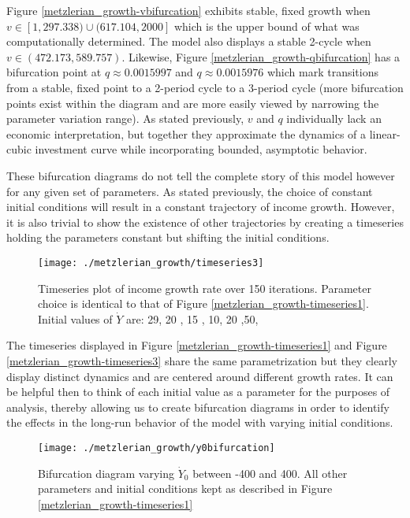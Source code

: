 Figure \ref{metzlerian_growth-vbifurcation} exhibits stable, fixed growth when $v\in[1,297.338)\cup(617.104, 2000]$ which is the upper bound of what was computationally determined. The model also displays a stable 2-cycle when $v\in(472.173, 589.757)$. Likewise, Figure \ref{metzlerian_growth-qbifurcation} has a bifurcation point at $q\approx0.0015997$ and $q\approx0.0015976$ which mark transitions from a stable, fixed point to a 2-period cycle to a 3-period cycle (more bifurcation points exist within the diagram and are more easily viewed by narrowing the parameter variation range). As stated previously, $v$ and $q$ individually lack an economic interpretation, but together they approximate the dynamics of a linear-cubic investment curve while incorporating bounded, asymptotic behavior. 

These bifurcation diagrams do not tell the complete story of this model however for any given set of parameters. As stated previously, the choice of constant initial conditions will result in a constant trajectory of income growth. However, it is also trivial to show the existence of other trajectories by creating a timeseries holding the parameters constant but shifting the initial conditions.
\begin{figure}
    \centering
    \texttt{[image: ./metzlerian\_growth/timeseries3]}
    \caption{Timeseries plot of income growth rate over 150 iterations. Parameter choice is identical to that of Figure \ref{metzlerian_growth-timeseries1}. Initial values of $\dot Y$ are: 29, 20 , 15 , 10, 20 ,50,}
    \label{metzlerian_growth_timeseries3}
\end{figure}

The timeseries displayed in Figure \ref{metzlerian_growth-timeseries1} and Figure \ref{metzlerian_growth-timeseries3} share the same parametrization but they clearly display distinct dynamics and are centered around different growth rates. It can be helpful then to think of each initial value as a parameter for the purposes of analysis, thereby allowing us to create bifurcation diagrams in order to identify the effects in the long-run behavior of the model with varying initial conditions. 

\begin{figure}
    \centering
    \texttt{[image: ./metzlerian\_growth/y0bifurcation]}
    \caption{Bifurcation diagram varying $\dot Y_0$ between -400 and 400. All other parameters and initial conditions kept as described in Figure \ref{metzlerian_growth-timeseries1}}
    \label{metzlerian_growth-y0bifurcation}
\end{figure}

